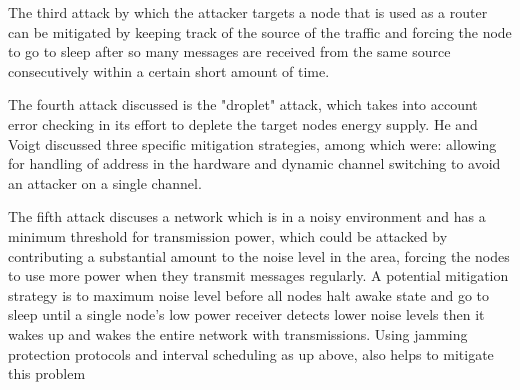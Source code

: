 The third attack by which the attacker targets a node that is used as a router can be mitigated by keeping track of the source of the traffic and forcing the node to go to sleep after so many messages are received from the same
source consecutively within a certain short amount of time. 

The fourth attack discussed is the "droplet" attack, which takes into account error checking in its effort to deplete the target nodes energy supply. He and Voigt discussed three specific mitigation strategies, among which were:
 allowing for handling of address in the hardware and dynamic channel switching to avoid an attacker on a single channel.

The fifth attack discuses a network which is in a noisy environment and has a minimum threshold for transmission power, which could be attacked by contributing a substantial amount to the noise level in the area, forcing the nodes
to use more power when they transmit messages regularly. A potential mitigation strategy is to maximum noise level before all nodes halt awake state and go to sleep until a single node's low power receiver detects lower noise levels
then it wakes up and wakes the entire network with transmissions. Using jamming protection protocols and interval scheduling as up above, also helps to mitigate this problem\cite{4476299}
 
   
